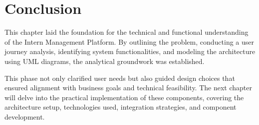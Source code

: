 \section{Conclusion}
\noindent
This chapter laid the foundation for the technical and functional understanding of the Intern Management Platform. By outlining the problem, conducting a user journey analysis, identifying system functionalities, and modeling the architecture using UML diagrams, the analytical groundwork was established.

\noindent
This phase not only clarified user needs but also guided design choices that ensured alignment with business goals and technical feasibility. The next chapter will delve into the practical implementation of these components, covering the architecture setup, technologies used, integration strategies, and component development.